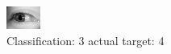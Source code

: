 \begin{figure}[h!]
\begin{center}
\includegraphics[width=0.60\columnwidth]{figures/ID3109_class_3_target_4.png}
\end{center}
\caption{ Classification: 3 actual target: 4}
\label{fig:ID3109_class_3_target_4}
\end{figure}
